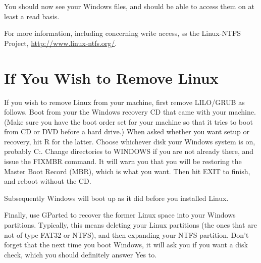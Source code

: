 \documentclass[11pt]{article}
\begin{document}
You should now see your Windows files, and should be able to access them
on at least a read basis.

For more information, including concerning write access, ss the
Linux-NTFS Project, \url{http://www.linux-ntfs.org/}.

% 

\section{If You Wish to Remove Linux}

If you wish to remove Linux from your machine, first remove LILO/GRUB as
follows.  Boot from your the Windows recovery CD that came with your
machine.  (Make sure you have the boot order set for your machine so
that it tries to boot from CD or DVD before a hard drive.)
When asked whether you want setup or recovery, hit R for the
latter.  Choose whichever disk your Windows system is on, probably C:.
Change directories to WINDOWS if you are not already there, and issue
the FIXMBR command.  It will warn you that you will be restoring the
Master Boot Record (MBR), which is what you want.  Then hit EXIT to
finish, and reboot without the CD.

Subsequently Windows will boot up as it did before you installed
Linux.  

Finally, use GParted to recover the former Linux space into your Windows
partitions.  Typically, this means deleting your Linux partitions (the
ones that are not of type FAT32 or NTFS), and then expanding your NTFS
partition.  Don't forget that the next time you boot Windows, it will
ask you if you want a disk check, which you should definitely answer Yes
to.
\end{document}
